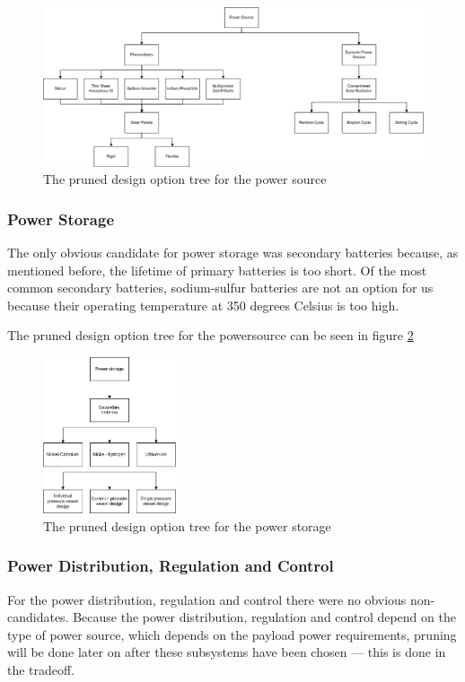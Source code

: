 \begin{figure}
\centering
\includegraphics[width=\textheight, angle=90]{chapters/img/DOTeps_sourcePruned.png}
\caption{The pruned design option tree for the power source}
\label{fig:DOTeps_sourcePruned}
\end{figure}

\subsubsection{Power Storage}
\label{pruneEPS:Storage}
The only obvious candidate for power storage was secondary batteries because, as mentioned before, the lifetime of primary batteries is too short.
Of the most common secondary batteries, sodium-sulfur batteries are not an option for us because their operating temperature at 350 degrees Celsius is too high.

The pruned design option tree for the powersource can be seen in figure \ref{fig:DOTeps_storagePruned}

\begin{figure}
\centering
\includegraphics[width=0.35\textwidth]{chapters/img/DOTeps_storagePruned.png}
\caption{The pruned design option tree for the power storage}
\label{fig:DOTeps_storagePruned}
\end{figure}

\subsubsection{Power Distribution, Regulation and Control}
\label{pruneEPS:Distribution}
For the power distribution, regulation and control there were no obvious non-candidates. Because the power distribution, regulation and control depend on the type of power source, which depends on the payload power requirements, pruning will be done later on after these subsystems have been chosen --- this is done in the tradeoff.

